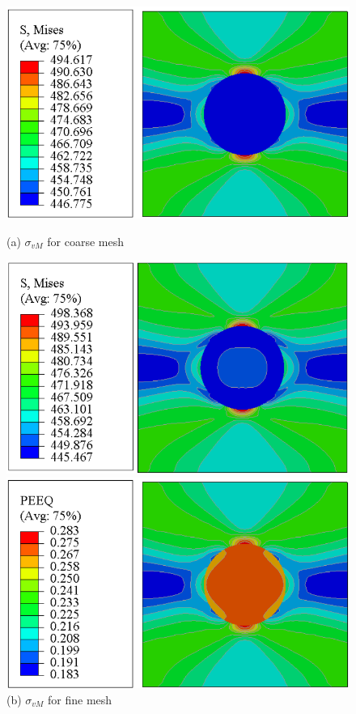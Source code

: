 \documentclass[12pt]{article}
\begin{document}
\begin{figure}[H]
    \centering
    \begin{minipage}{0.48\textwidth}
        \centering
        \includegraphics[width=\textwidth]{images/MISES_Coarse.png}
        \caption*{(a) $\sigma_{vM}$ for coarse mesh}
    \end{minipage}
    \hfill
    \begin{minipage}{0.48\textwidth}
        \centering
        \includegraphics[width=\textwidth]{images/MISES_Fine.png}
        \caption*{(b) $\sigma_{vM}$ for fine mesh}
    \end{minipage}
    \vspace{1em}
    \begin{minipage}{0.48\textwidth}
        \centering
        \includegraphics[width=\textwidth]{images/PEEQ_Coarse.png}

\end{minipage}
\end{figure}
\end{document}
